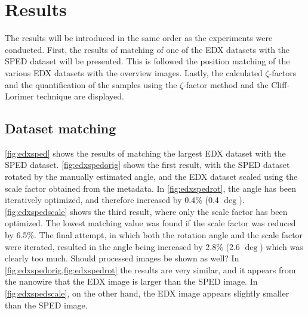 \chapter{Results}

The results will be introduced in the same order as the experiments were conducted. First, the results of matching of one of the EDX datasets with the SPED dataset will be presented. This is followed the position matching of the various EDX datasets with the overview images. Lastly, the calculated $\zeta$-factors and the quantification of the samples using the $\zeta$-factor method and the Cliff-Lorimer technique are displayed.

\section{Dataset matching}

\cref{fig:edxsped} shows the results of matching the largest EDX dataset with the SPED dataset. \cref{fig:edxspedorig} shows the first result, with the SPED dataset rotated by the manually estimated angle, and the EDX dataset scaled using the scale factor obtained from the metadata. In \cref{fig:edxspedrot}, the angle has been iteratively optimized, and therefore increased by 0.4\% (0.4 $\deg$). \cref{fig:edxspedscale} shows the third result, where only the scale factor has been optimized. The lowest matching value was found if the scale factor was reduced by 6.5\%. The final attempt, in which both the rotation angle and the scale factor were iterated, resulted in the angle being increased by 2.8\% (2.6 $\deg$) which was clearly too much. Should processed images be shown as well? %
In \cref{fig:edxspedorig,fig:edxspedrot} the results are very similar, and it appears from the nanowire that the EDX image is larger than the SPED image. In \cref{fig:edxspedscale}, on the other hand, the EDX image appears slightly smaller than the SPED image. 

